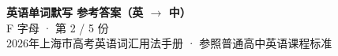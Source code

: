 \documentclass[10pt,a4paper]{article}
\begin{document}
\pagestyle{plain}

\begin{center}
{\LARGE\bfseries 英语单词默写 \quad 参考答案（英 $\to$ 中）}\\[0.22em]
{\large F 字母 · 第 2 / 5 份}\\[0.18em]
{\small 2026年上海市高考英语词汇用法手册 · 参照普通高中英语课程标准}
\end{center}

\vspace{0.2em}
\noindent{\color{rulegray}\rule{\textwidth}{0.8pt}}

\vspace{0.35em}

\vspace{0.25em}
\renewcommand{\arraystretch}{1.32}
\end{document}
